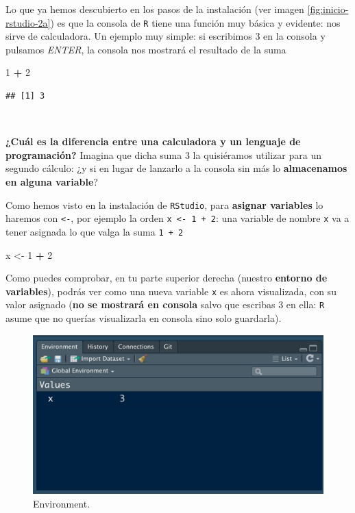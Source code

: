 \documentclass[11pt,]{book}
\newenvironment{Shaded}{\begin{snugshade}}{\end{snugshade}}
\newcommand{\DecValTok}[1]{\textcolor[rgb]{0.06,0.06,0.06}{#1}}
\newcommand{\NormalTok}[1]{#1}
\newcommand{\OperatorTok}[1]{\textcolor[rgb]{0.43,0.43,0.43}{\textbf{#1}}}
\newcommand{\StringTok}[1]{\textcolor[rgb]{0.5,0.5,0.5}{#1}}
\begin{document}
Lo que ya hemos descubierto en los pasos de la instalación (ver imagen \ref{fig:inicio-rstudio-2a}) es que la consola de \texttt{R} tiene una función muy básica y evidente: nos sirve de calculadora. Un ejemplo muy simple: si escribimos 3 en la consola y pulsamos \emph{ENTER}, la consola nos mostrará el resultado de la suma

\begin{Shaded}
\begin{Highlighting}[]
\DecValTok{1} \OperatorTok{+}\StringTok{ }\DecValTok{2}
\end{Highlighting}
\end{Shaded}

\begin{verbatim}
## [1] 3
\end{verbatim}

~

\textbf{¿Cuál es la diferencia entre una calculadora y un lenguaje de programación?} Imagina que dicha suma 3 la quisiéramos utilizar para un segundo cálculo: ¿y si en lugar de lanzarlo a la consola sin más lo \textbf{almacenamos en alguna variable}?

Como hemos visto en la instalación de \texttt{RStudio}, para \textbf{asignar variables} lo haremos con \texttt{\textless{}-}, por ejemplo la orden \texttt{x\ \textless{}-\ 1\ +\ 2}: una variable de nombre \texttt{x} va a tener asignada lo que valga la suma \texttt{1\ +\ 2}

\begin{Shaded}
\begin{Highlighting}[]
\NormalTok{x <-}\StringTok{ }\DecValTok{1} \OperatorTok{+}\StringTok{ }\DecValTok{2}
\end{Highlighting}
\end{Shaded}

Como puedes comprobar, en tu parte superior derecha (nuestro \textbf{entorno de variables}), podrás ver como una nueva variable \texttt{x} es ahora visualizada, con su valor asignado (\textbf{no se mostrará en consola} salvo que escribas 3 en ella: \texttt{R} asume que no querías visualizarla en consola sino solo guardarla).

\begin{figure}

{\centering \includegraphics[width=0.75\linewidth]{./img/environment_1} 

}

\caption{Environment.}\label{fig:unnamed-chunk-8}
\end{figure}
\end{document}
